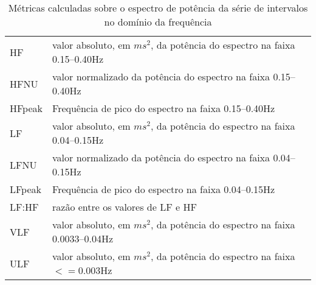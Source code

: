             \begin{table}[h!]
                \centering
                \caption{Métricas calculadas sobre o espectro de potência da série de intervalos no domínio da frequência}
                \label{freqdomain}
                \begin{tabular}{l | p{8cm}}
                HF & valor absoluto, em $ms^2$, da potência do espectro na faixa 0.15–0.40Hz\\
                HFNU  & valor normalizado da potência do espectro na faixa 0.15–0.40Hz\\
                HFpeak & Frequência de pico do espectro na faixa 0.15–0.40Hz \\
                LF & valor absoluto, em $ms^2$, da potência do espectro na faixa 0.04–0.15Hz \\
                LFNU  & valor normalizado da potência do espectro na faixa 0.04–0.15Hz\\
                LFpeak & Frequência de pico do espectro na faixa 0.04–0.15Hz \\
                LF:HF & razão entre os valores de LF e HF \\
                VLF & valor absoluto, em $ms^2$, da potência do espectro na faixa 0.0033–0.04Hz \\
                ULF & valor absoluto, em $ms^2$, da potência do espectro na faixa $<= 0.003$Hz \\
                \end{tabular}
            \end{table}